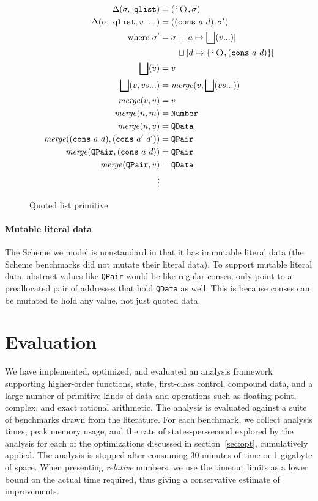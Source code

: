 \documentclass[preprint,onecolumn,9pt]{sigplanconf} %
\begin{document}
\begin{figure}
\begin{align*}
\Delta(\sigma,\ {\tt qlist}) &= (\mbox{{\tt '()}}, \sigma) \\
\Delta(\sigma,\ {\tt qlist}, v ..._+) &= (({\tt cons}\ a\ d), \sigma') \\
\qquad \mbox{where } \sigma' &= \sigma\sqcup[a \mapsto \bigsqcup(v ...)] \\
                            &\qquad \sqcup[d \mapsto \{ \mbox{{\tt '()}}, ({\tt cons}\ a\ d)\}] \\
\bigsqcup(v) &= v \\
\bigsqcup(v, vs ...) &= \mathit{merge}(v, \bigsqcup(vs ...)) \\
\mathit{merge}(v, v) &= v \\
\mathit{merge}(n, m) &= {\tt Number} \\
\mathit{merge}(n, v) &= {\tt QData} \\
\mathit{merge}(({\tt cons}\ a\ d), ({\tt cons}\ a'\ d')) &= {\tt QPair} \\
\mathit{merge}({\tt QPair}, ({\tt cons}\ a\ d)) &= {\tt QPair} \\
\mathit{merge}({\tt QPair}, v) &= {\tt QData} \\
\vdots
\end{align*}
\caption{Quoted list primitive}
\label{fig:qlist}
\end{figure}

\paragraph{Mutable literal data}
The Scheme we model is nonstandard in that it has immutable literal
data (the Scheme benchmarks did not mutate their literal data). To
support mutable literal data, abstract values like {\tt QPair} would
be like regular conses, only point to a preallocated pair of addresses
that hold {\tt QData} as well. This is because conses can be mutated
to hold any value, not just quoted data.

\section{Evaluation}
\label{sec:eval}

We have implemented, optimized, and evaluated an analysis framework
supporting higher-order functions, state, first-class control,
compound data, and a large number of primitive kinds of data and
operations such as floating point, complex, and exact rational
arithmetic.  The analysis is evaluated against a suite of benchmarks
drawn from the literature.
%
For each benchmark, we collect analysis times, peak memory usage, and
the rate of states-per-second explored by the analysis for each of the
optimizations discussed in section~\ref{sec:opt}, cumulatively
applied.  The analysis is stopped after consuming 30 minutes of time
or 1 gigabyte of space.  When presenting \emph{relative} numbers, we
use the timeout limits as a lower bound on the actual time required,
thus giving a conservative estimate of improvements.
\end{document}
